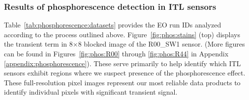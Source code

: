 \subsubsection{Results of phosphorescence detection in ITL sensors}\label{phos-results}

Table~\ref{tab:phosphorescence:datasets} provides the EO run IDs analyzed according to the process outlined above. Figure~\ref{fig:phos:stains} (top) displays the transient term in 8$\times$8 blocked image of the R00\_SW1 sensor. (More figures can be found in  Figures~\ref{fig:phos:R00} through \ref{fig:phos:R44} in Appendix \ref{appendix:phosphorescence}). These serve primarily to help identify which ITL sensors exhibit regions where we suspect presence of the phosphorescence effect. These full-resolution pixel images represent our most reliable data products to identify individual pixels with significant transient signal. 

